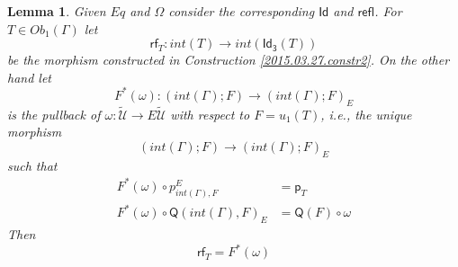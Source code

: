 \documentclass[12pt]{article}
\numberwithin{equation}{section}
\newtheorem{lemma}[proposition]{Lemma}
\newcommand{\llabel}[1]{\label{#1}}
\newcommand{\sr}{\rightarrow}
\newcommand{\wt}{\widetilde}
\newcommand{\p}{\mathsf{p}}
\newcommand{\Id}{\mathsf{Id}} %
\newcommand{\Idx}{\mathsf{Id_3}} %
\newcommand{\refl}{\mathsf{refl}}
\newcommand{\U}{\mathcal{U}}
\newcommand{\rf}{\mathsf{rf}}
\newcommand{\Q}{\mathsf{Q}}
\begin{document}
\begin{lemma}
\llabel{2015.03.31.l2} Given $Eq$ and $\Omega$ consider the corresponding $\Id$
and $\refl$. For $T\in Ob_1(\Gamma)$ let %
$$\rf_T:int(T)\sr int(\Idx(T))$$
%
be the morphism constructed in Construction \ref{2015.03.27.constr2}. On the
other hand let
%
$$F^*(\omega):(int(\Gamma);F)\sr (int(\Gamma);F)_{E}$$
%
is the pullback of $\omega:\wt{\U}\sr E\wt{\U}$ with respect to $F=u_1(T)$,
i.e., the unique morphism
%
$$(int(\Gamma);F)\sr (int(\Gamma);F)_{E}$$
%
such that
%
\begin{align*}
  F^*(\omega)\circ p^{E}_{int(\Gamma),F} & = \p_{T} \\
  F^*(\omega)\circ \Q(int(\Gamma),F)_{E} & = \Q(F)\circ \omega
\end{align*}
%
Then
%
$$\rf_T=F^*(\omega)$$
%
\end{lemma}
%
\end{document}
